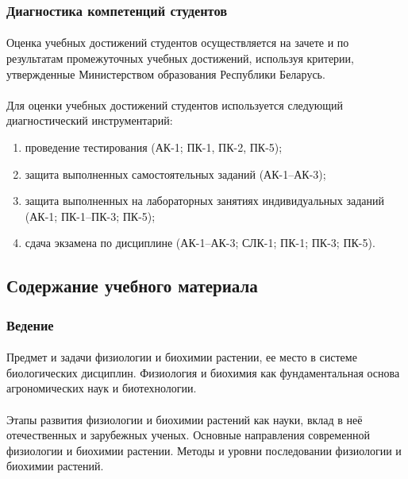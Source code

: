 \subsubsection{Диагностика компетенций студентов}

\paragraph*{}Оценка учебных достижений студентов осуществляется на зачете и по результатам промежуточных учебных достижений, используя критерии, утвержденные Министерством образования Республики Беларусь. 

\paragraph*{}Для оценки учебных достижений студентов используется следующий диагностический инструментарий:

\begin{enumerate}

\item проведение тестирования (АК-1; ПК-1, ПК-2, ПК-5);
\item защита выполненных самостоятельных заданий (АК-1–АК-3);
\item защита выполненных на лабораторных занятиях индивидуальных заданий (АК-1; ПК-1–ПК-3; ПК-5);
\item сдача экзамена по дисциплине (АК-1–АК-3; СЛК-1; ПК-1; ПК-3; ПК-5). 

\end{enumerate}

\subsection{Содержание учебного материала}

\subsubsection{Ведение}

\paragraph*{}Предмет и задачи физиологии и биохимии растении, ее место в системе биологических дисциплин. Физиология и биохимия как фундаментальная основа агрономических наук и биотехнологии.

\paragraph*{}Этапы развития физиологии и биохимии растений как науки, вклад в неё отечественных и зарубежных ученых. Основные направления современной физиологии и биохимии растении. Методы и уровни последовании физиологии и биохимии растений.

